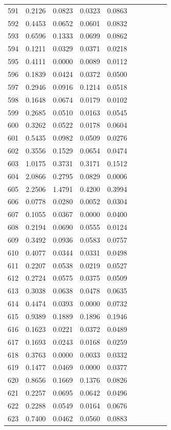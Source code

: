 \begin{table}
\begin{tabular}{cccccccccc}
591& 0.2126& 0.0823& 0.0323& 0.0863\\ 
592& 0.4453& 0.0652& 0.0601& 0.0832\\ 
593& 0.6596& 0.1333& 0.0699& 0.0862\\ 
594& 0.1211& 0.0329& 0.0371& 0.0218\\ 
595& 0.4111& 0.0000& 0.0089& 0.0112\\ 
596& 0.1839& 0.0424& 0.0372& 0.0500\\ 
597& 0.2946& 0.0916& 0.1214& 0.0518\\ 
598& 0.1648& 0.0674& 0.0179& 0.0102\\ 
599& 0.2685& 0.0510& 0.0163& 0.0545\\ 
600& 0.3262& 0.0522& 0.0178& 0.0604\\ 
601& 0.5435& 0.0982& 0.0509& 0.0276\\ 
602& 0.3556& 0.1529& 0.0654& 0.0474\\ 
603& 1.0175& 0.3731& 0.3171& 0.1512\\ 
604& 2.0866& 0.2795& 0.0829& 0.0006\\ 
605& 2.2506& 1.4791& 0.4200& 0.3994\\ 
606& 0.0778& 0.0280& 0.0052& 0.0304\\ 
607& 0.1055& 0.0367& 0.0000& 0.0400\\ 
608& 0.2194& 0.0690& 0.0555& 0.0124\\ 
609& 0.3492& 0.0936& 0.0583& 0.0757\\ 
610& 0.4077& 0.0344& 0.0331& 0.0498\\ 
611& 0.2207& 0.0538& 0.0219& 0.0527\\ 
612& 0.2724& 0.0575& 0.0375& 0.0509\\ 
613& 0.3038& 0.0638& 0.0478& 0.0635\\ 
614& 0.4474& 0.0393& 0.0000& 0.0732\\ 
615& 0.9389& 0.1889& 0.1896& 0.1946\\ 
616& 0.1623& 0.0221& 0.0372& 0.0489\\ 
617& 0.1693& 0.0243& 0.0168& 0.0259\\ 
618& 0.3763& 0.0000& 0.0033& 0.0332\\ 
619& 0.1477& 0.0469& 0.0000& 0.0377\\ 
620& 0.8656& 0.1669& 0.1376& 0.0826\\ 
621& 0.2257& 0.0695& 0.0642& 0.0496\\ 
622& 0.2288& 0.0549& 0.0164& 0.0676\\ 
623& 0.7400& 0.0462& 0.0560& 0.0883\\ 

\end{tabular}
\end{table}
